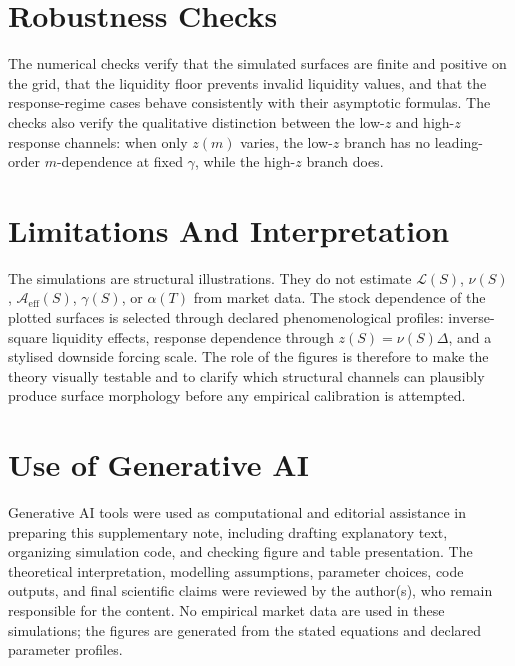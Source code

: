 \documentclass[11pt]{article}
\newcommand{\Aeff}{\mathcal A_{\mathrm{eff}}}
\newcommand{\Liq}{\mathcal L}
\begin{document}
\section{Robustness Checks}

The numerical checks verify that the simulated surfaces are finite and
positive on the grid, that the liquidity floor prevents invalid liquidity
values, and that the response-regime cases behave consistently with their
asymptotic formulas. The checks also verify the qualitative distinction
between the low-\(z\) and high-\(z\) response channels: when only \(z(m)\)
varies, the low-\(z\) branch has no leading-order \(m\)-dependence at fixed
\(\gamma\), while the high-\(z\) branch does.

\section{Limitations And Interpretation}

The simulations are structural illustrations. They do not estimate
\(\Liq(S)\), \(\nu(S)\), \(\Aeff(S)\), \(\gamma(S)\), or \(\alpha(T)\) from
market data. The stock dependence of the plotted surfaces is selected through
declared phenomenological profiles: inverse-square liquidity effects,
response dependence through \(z(S)=\nu(S)\Delta\), and a stylised downside
forcing scale. The role of the figures is therefore to make the theory
visually testable and to clarify which structural channels can plausibly
produce surface morphology before any empirical calibration is attempted.

\section*{Use of Generative AI}

Generative AI tools were used as computational and editorial assistance in
preparing this supplementary note, including drafting explanatory text,
organizing simulation code, and checking figure and table presentation. The
theoretical interpretation, modelling assumptions, parameter choices, code
outputs, and final scientific claims were reviewed by the author(s), who
remain responsible for the content. No empirical market data are used in
these simulations; the figures are generated from the stated equations and
declared parameter profiles.
\end{document}

